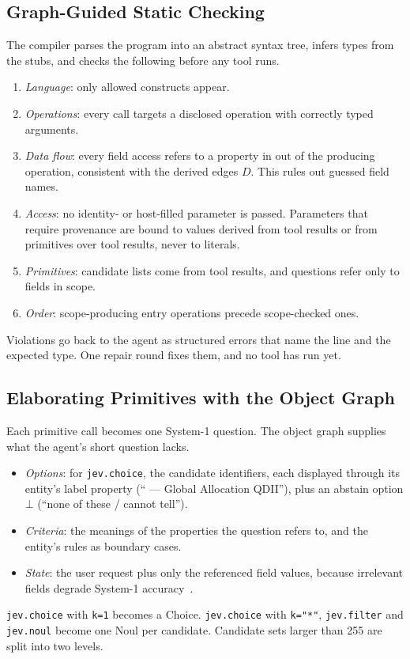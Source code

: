 \subsection{Graph-Guided Static Checking}
\label{sec:check}
The compiler parses the program into an abstract syntax tree, infers types from the stubs, and checks the following before any tool runs.
\begin{enumerate}
  \item \emph{Language}: only allowed constructs appear.
  \item \emph{Operations}: every call targets a disclosed operation with correctly typed arguments.
  \item \emph{Data flow}: every field access refers to a property in $\mathrm{out}$ of the producing operation, consistent with the derived edges $D$. This rules out guessed field names.
  \item \emph{Access}: no identity- or host-filled parameter is passed. Parameters that require provenance are bound to values derived from tool results or from primitives over tool results, never to literals.
  \item \emph{Primitives}: candidate lists come from tool results, and questions refer only to fields in scope.
  \item \emph{Order}: scope-producing entry operations precede scope-checked ones.
\end{enumerate}
Violations go back to the agent as structured errors that name the line and the expected type. One repair round fixes them, and no tool has run yet.

\subsection{Elaborating Primitives with the Object Graph}
\label{sec:elaborate}
Each primitive call becomes one System-1 question. The object graph supplies what the agent's short question lacks.
\begin{itemize}
  \item \emph{Options}: for \texttt{jev.choice}, the candidate identifiers, each displayed through its entity's label property (`` --- Global Allocation QDII''), plus an abstain option $\bot$ (``none of these / cannot tell'').
  \item \emph{Criteria}: the meanings of the properties the question refers to, and the entity's rules as boundary cases.
  \item \emph{State}: the user request plus only the referenced field values, because irrelevant fields degrade System-1 accuracy~\cite{typesafe2026jev}.
\end{itemize}
\texttt{jev.choice} with \texttt{k=1} becomes a Choice. \texttt{jev.choice} with \texttt{k="*"}, \texttt{jev.filter} and \texttt{jev.noul} become one Noul per candidate. Candidate sets larger than 255 are split into two levels.


